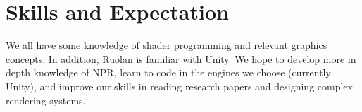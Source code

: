 \documentclass[acmtog, table, dvipsnames]{acmart}
\begin{document}
\section{Skills and Expectation}
We all have some knowledge of shader programming and relevant graphics concepts. In addition, Ruolan is familiar with Unity. We hope to develop more in depth knowledge of NPR, learn to code in the engines we choose (currently Unity), and improve our skills in reading research papers and designing complex rendering systems.
%
%
%
%
%
%
%
%
%


\end{document}
